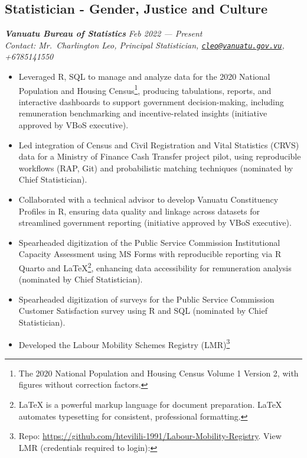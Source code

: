 \documentclass[
  letterpaper,
  DIV=11,
  numbers=noendperiod]{scrartcl}
\providecommand{\tightlist}{%
  \setlength{\itemsep}{0pt}\setlength{\parskip}{0pt}}
\begin{document}
\subsection{Statistician - Gender, Justice and
Culture}\label{statistician---gender-justice-and-culture}

\textbf{\emph{Vanuatu Bureau of Statistics}} {\emph{Feb 2022 ---
Present}}\\
\emph{Contact: Mr.~Charlington Leo, Principal Statistician,
\href{mailto:cleo@vanuatu.gov.vu}{\nolinkurl{cleo@vanuatu.gov.vu}},
+6785141550}

\begin{itemize}
\tightlist
\item
  Leveraged R, SQL to manage and analyze data for the 2020 National
  Population and Housing Census\footnote{The 2020 National Population
    and Housing Census Volume 1 Version 2, with figures without
    correction factors.}, producing tabulations, reports, and
  interactive dashboards to support government decision-making,
  including remuneration benchmarking and incentive-related insights
  (initiative approved by VBoS executive).
\item
  Led integration of Census and Civil Registration and Vital Statistics
  (CRVS) data for a Ministry of Finance Cash Transfer project pilot,
  using reproducible workflows (RAP, Git) and probabilistic matching
  techniques (nominated by Chief Statistician).
\item
  Collaborated with a technical advisor to develop Vanuatu Constituency
  Profiles in R, ensuring data quality and linkage across datasets for
  streamlined government reporting (initiative approved by VBoS
  executive).
\item
  Spearheaded digitization of the Public Service Commission
  Institutional Capacity Assessment using MS Forms with reproducible
  reporting via R Quarto and LaTeX\footnote{LaTeX is a powerful markup
    language for document preparation. LaTeX automates typesetting for
    consistent, professional formatting.}, enhancing data accessibility
  for remuneration analysis (nominated by Chief Statistician).
\item
  Spearheaded digitization of surveys for the Public Service Commission
  Customer Satisfaction survey using R and SQL (nominated by Chief
  Statistician).
\item
  Developed the Labour Mobility Schemes Registry (LMR)\footnote{Repo:
    \url{https://github.com/htevilili-1991/Labour-Mobility-Registry}.
    View LMR (credentials required to login):
}
\end{itemize}
\end{document}
